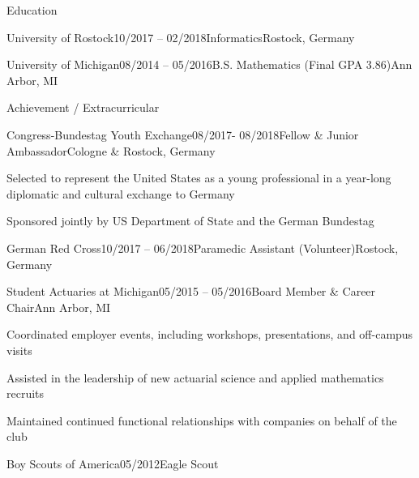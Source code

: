 \documentclass{resume}
\begin{document}
    \begin{cvSection}{Education}

        \begin{cvSubsection}{University of Rostock}{10/2017 -- 02/2018}{Informatics}{Rostock, Germany}
        \end{cvSubsection}

        \begin{cvSubsection}{University of Michigan}{08/2014 -- 05/2016}{B.S. Mathematics (Final GPA 3.86)}{Ann Arbor, MI}
        \end{cvSubsection}

    \end {cvSection}

    \begin{cvSection}{Achievement / Extracurricular}

        \begin{cvSubsection}{Congress-Bundestag Youth Exchange}{08/2017- 08/2018}{Fellow \& Junior Ambassador}{Cologne \& Rostock, Germany}
            \item Selected to represent the United States as a young professional in a year-long diplomatic
            and cultural exchange to Germany
            \item Sponsored jointly by US Department of State and the German Bundestag
        \end{cvSubsection}

        \begin{cvSubsection}{German Red Cross}{10/2017 -- 06/2018}{Paramedic Assistant (Volunteer)}{Rostock, Germany}
        \end{cvSubsection}

        \begin{cvSubsection}{Student Actuaries at Michigan}{05/2015 -- 05/2016}{Board Member \& Career Chair}{Ann Arbor, MI}
            \item Coordinated employer events, including workshops, presentations, and off-campus visits
            \item Assisted in the leadership of new actuarial science and applied mathematics recruits
            \item Maintained continued functional relationships with companies on behalf of the club
        \end{cvSubsection}

        \begin{cvSubsection}{Boy Scouts of America}{05/2012}{Eagle Scout}{}
        \end{cvSubsection}

    \end {cvSection}
\end{document}
